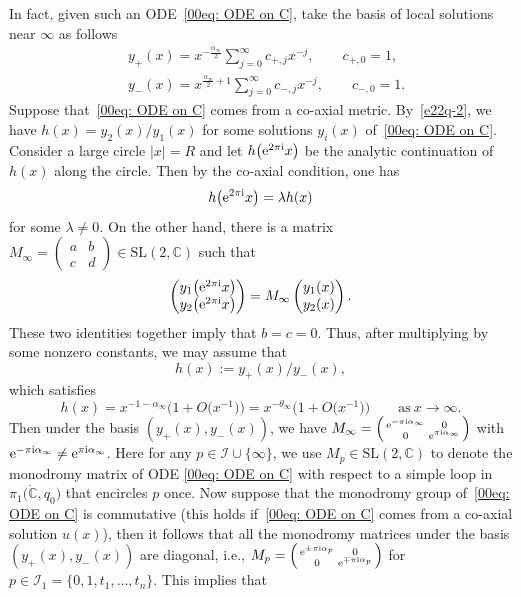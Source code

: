 \documentclass[pdftex]{sigma}
\numberwithin{equation}{section}
\def\SL{\mathrm{SL}}
\def\C{\mathbb C}
\def\SL{\mathrm{SL}}
\def\SM#1#2#3#4{\left(\begin{smallmatrix}#1&#2\\#3&#4\end{smallmatrix}
 \right)}
\begin{document}
In fact, given such an ODE~\eqref{00eq: ODE on C}, take the basis of local solutions near $\infty$ as follows
\begin{align}
&y_{+}(x)=x^{-\frac{\alpha_\infty}{2}}\sum_{j=0}^\infty c_{+,j}x^{-j},\qquad c_{+,0}=1, \nonumber\\
&y_{-}(x)=x^{\frac{\alpha_\infty}{2}+1}\sum_{j=0}^\infty
c_{-,j}x^{-j},\qquad c_{-,0}=1. \label{00e0q-y+}
\end{align}
Suppose that~\eqref{00eq: ODE on C} comes from a co-axial metric.
By~\eqref{e22q-2}, we have $h(x)=y_2(x)/y_1(x)$ for some solutions
$y_i(x)$ of~\eqref{00eq: ODE on C}. Consider a large circle $|x|=R$
and let $h\bigl({\rm e}^{2\pi {\rm i}}x\bigr)$ be the analytic continuation of $h(x)$ along
the circle. Then by the co-axial condition, one has
\[
h\bigl({\rm e}^{2\pi {\rm i}}x\bigr)=\lambda h(x)
\]
for some $\lambda\neq 0$. On the other hand, there is a matrix
$M_\infty=\SM abcd\in\SL(2,\C)$ such that
\[
\begin{pmatrix}
 y_1\bigl({\rm e}^{2\pi {\rm i}}x\bigr) \\y_2\bigl({\rm e}^{2\pi {\rm i}}x\bigr) \end{pmatrix}
=M_\infty\begin{pmatrix}y_1(x)\\y_2(x)\end{pmatrix}.
\]
These two identities together imply that $b=c=0$. Thus, after
multiplying by some nonzero constants, we may assume that
\begin{equation}\label{200h}
 h(x):=y_{+}(x)/y_{-}(x),
\end{equation}
which satisfies
\begin{equation}
 \label{h-infty}h(x)=x^{-1-\alpha_\infty}\bigl(1+O\bigl(x^{-1}\bigr)\bigr)=x^{-\theta_\infty}\bigl(1+O\bigl(x^{-1}\bigr)\bigr)\qquad
 \text{as}\ x\to\infty.
\end{equation}
Then under the basis $(y_{+}(x), y_{-}(x))$, we have
$M_{\infty}=\SM{{\rm e}^{-\pi {\rm i} \alpha_\infty}}{0}{0}{{\rm e}^{\pi {\rm i}
 \alpha_\infty}}$ with ${\rm e}^{-\pi {\rm i} \alpha_\infty}\neq {\rm e}^{\pi {\rm i}
 \alpha_\infty}$. Here for any $p\in \mathcal{I}\cup\{\infty\}$, we
use $M_p\in\SL(2,\mathbb{C})$ to denote the monodromy matrix of ODE
\eqref{00eq: ODE on C} with respect to a simple loop in
$\pi_1\bigl(\dot{\C}, q_0\bigr)$ that encircles $p$ once.
Now suppose that the monodromy group of~\eqref{00eq: ODE on C} is commutative (this holds if~\eqref{00eq: ODE on C} comes from a co-axial solution $u(x)$), then it follows that all the monodromy matrices under the basis $(y_{+}(x), y_{-}(x))$ are diagonal, i.e., $M_{p}=\SM{{\rm e}^{\pm\pi {\rm i} \alpha_{p}}}{0}{0}{{\rm e}^{\mp\pi {\rm i} \alpha_{p}}}$ for $p\in \mathcal{I}_1=\{0,1,t_1,\dots,t_n\}$. This implies that
\end{document}
